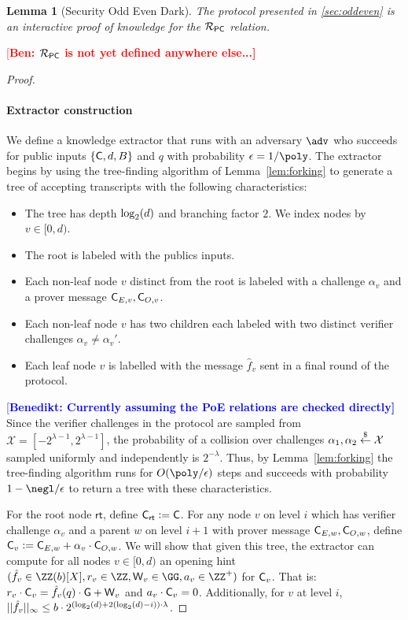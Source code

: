 \documentclass[11pt]{article}
\theoremstyle{Definition}
\newtheorem{lemma}{Lemma}
\newcommand{\ben}[1]{{\textcolor{red}{[\bf Ben: #1]}}}
\newcommand{\benedikt}[1]{{\textcolor{blue}{[\bf Benedikt: #1]}}}
\newcommand{\ben}[1]{}
\begin{document}
	
\begin{lemma}[Security Odd Even Dark]
	The protocol presented in \cref{sec:oddeven} is an interactive proof of knowledge for the $\mathcal{R}_{\mathsf{PC}}$ relation.
\end{lemma}
\ben{$\mathcal{R}_{\mathsf{PC}}$ is not yet defined anywhere else...}
\begin{proof}

~\paragraph{Extractor construction}
		We define a knowledge extractor that runs with an adversary $\adv$ who succeeds for public inputs $\{\mathsf{C},d,B \}$ and $q$ with probability $\epsilon = 1/\poly$. The extractor begins by using the tree-finding algorithm of Lemma~\ref{lem:forking} to generate a tree of accepting transcripts with the following characteristics: 
\begin{itemize}
\item The tree has depth $\log_2(d)$ and branching factor $2$. We index nodes by $v \in [0, d)$.
\item The root is labeled with the publics inputs. 
\item Each non-leaf node $v$ distinct from the root is labeled with a challenge $\alpha_{v}$ and a prover message $\mathsf{C}_{E,v},\mathsf{C}_{O,v}$.
\item Each non-leaf node $v$ has two children each labeled with two distinct verifier challenges 
$\alpha_{v} \neq \alpha_{v}'$.
\item Each leaf node $v$ is labelled with the message $\hat{f}_v$ sent in a final round of the protocol. 
\end{itemize} 

\benedikt{Currently assuming the PoE relations are checked directly}
Since the verifier challenges in the protocol are sampled from $\mathcal{X} = [-2^{\lambda -1}, 2^{\lambda -1}]$, the probability of a collision over challenges $\alpha_1, \alpha_2 \overset{\$}{\gets} \mathcal{X}$ sampled uniformly and independently is $2^{-\lambda}$. Thus, by Lemma~\ref{lem:forking} the tree-finding algorithm runs for $O(\poly/\epsilon)$ steps and succeeds with probability $1 - \negl/\epsilon$ to return a tree with these characteristics.

For the root node $\textsf{rt}$, define $\mathsf{C}_\textsf{rt} \mathrel{\mathop:}= \mathsf{C}$. For any node $v$ on level $i$ which has verifier challenge $\alpha_v$ and a parent $w$ on level $i+1$ with prover message $\mathsf{C}_{E,w},\mathsf{C}_{O,w}$, define $\mathsf{C}_v \mathrel{\mathop:}= \mathsf{C}_{E,w} + \alpha_v \cdot \mathsf{C}_{O,w}$.
We will show that given this tree, the extractor can compute for all nodes $v \in [0, d)$ an opening hint $(\hat{f}_v \in \ZZ(b)[X],\denom_v \in \ZZ,\gr{W}_v \in \GG,a_v \in \ZZ^+)$ for $\mathsf{C}_v$. That is: $r_v \cdot \mathsf{C}_v=\hat{f}_v(q) \cdot \mathsf{G} +\mathsf{W}_v$ and $a_v \cdot \mathsf{C}_v=0$. Additionally, for $v$ at level $i$, $||\hat{f}_v||_\infty \leq b\cdot 2^{(\log_2(d)+2(\log_2(d)-i)) \cdot \lambda}$.


\end{proof}
\end{document}
